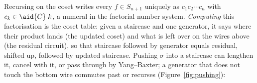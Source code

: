 \medskip\noindent Recursing on the coset writes every $f \in S_{n+1}$
uniquely as $c_1 c_2 \cdots c_n$ with $c_k \in \aid{C}\;k$, a numeral
in the factorial number system.  \emph{Computing} this factorisation is
the coset table: given a staircase and one generator, it says where
their product lands (the updated coset) and what is left over on the
wires above (the residual circuit), so that staircase followed by
generator equals residual, shifted up, followed by updated staircase.
Pushing $\sigma$ into a staircase can lengthen it, cancel with it, or
pass through by Yang--Baxter; a generator that does not touch the
bottom wire commutes past or recurses (Figure~\ref{fig:pushing}):

\begin{minipage}[c]{0.7\textwidth}
\begingroup\renewcommand{\AgdaCodeStyle}{\scriptsize}
\begin{code}%
\>[0]\AgdaSpace{}%
\AgdaSymbol{:}\AgdaSpace{}%
\AgdaSpace{}%
\AgdaSymbol{(}\AgdaSpace{}%
\AgdaSymbol{)}\AgdaSpace{}%
\AgdaSpace{}%
\AgdaSpace{}%
\AgdaSymbol{(}\AgdaSpace{}%
\AgdaSymbol{)}\AgdaSpace{}%
\AgdaSpace{}%
\AgdaSpace{}%
\AgdaSymbol{(}\AgdaSpace{}%
\AgdaSymbol{)}\AgdaSpace{}%
\AgdaSpace{}%
\AgdaSpace{}%
\AgdaSymbol{(}\AgdaSpace{}%
\AgdaSymbol{)}\<%
\\
\>[0]\AgdaSpace{}%
%
\>[15]\AgdaSpace{}%
\AgdaSymbol{=}\AgdaSpace{}%
\AgdaSpace{}%
\AgdaOperator{\AgdaInductiveConstructor{,}}\AgdaSpace{}%
\AgdaSpace{}%
%
\>[54]\<%
\\
\>[0]\AgdaSpace{}%
\AgdaSymbol{(}\AgdaSpace{}%
\AgdaSymbol{)}%
\>[15]\AgdaSpace{}%
\AgdaSymbol{=}\AgdaSpace{}%
\AgdaSpace{}%
\AgdaOperator{\AgdaInductiveConstructor{,}}\AgdaSpace{}%
%
\>[54]\<%
\\
\>[0]\AgdaSpace{}%
\AgdaSymbol{(}\AgdaSpace{}%

\end{code}
\end{minipage}
